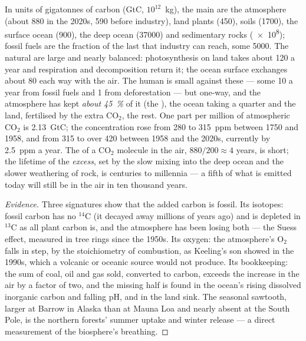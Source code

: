 \begin{proposition}\label{prop:b2:biogeochemical-cycles:carbon}
In units of gigatonnes of carbon (\unit{GtC}, $10^{12}$~kg), the
main  are the atmosphere (about 880 in the 2020s, 590
before industry), land plants (450), soils (1700), the surface
ocean (900), the deep ocean (\num{37000}) and sedimentary rocks
(\num{e8}); fossil fuels are the fraction of the last that
industry can reach, some \num{5000}. The natural  are large
and nearly balanced: photosynthesis on land takes about 120 a
year and respiration and decomposition return it; the ocean
surface exchanges about 80 each way with the air. The human  is
small against these --- some 10 a year from fossil fuels and 1
from deforestation --- but one-way, and the atmosphere has kept
\emph{about \qty{45}{\%}} of it (the \emph{}),
the ocean taking a quarter and the land, fertilised by the extra
$\mathrm{CO_2}$, the rest. One part per million of atmospheric $\mathrm{CO_2}$ is
\qty{2.13}{GtC}; the concentration rose from 280 to \num{315}~ppm
between 1750 and 1958, and from 315 to over \num{420} between 1958
and the 2020s, currently by \qty{2.5}{ppm} a year. The  of a $\mathrm{CO_2}$ molecule in the air, $880/200 \approx 4$ years,
is short; the lifetime of the \emph{excess}, set by the slow
mixing into the deep ocean and the slower weathering of rock, is
centuries to millennia --- a fifth of what is emitted today will
still be in the air in ten thousand years.
\end{proposition}
\begin{proof}[Evidence]
Three signatures show that the added carbon is fossil. Its
isotopes: fossil carbon has no $\mathrm{{}^{14}C}$ (it decayed away
millions of years ago) and is depleted in $\mathrm{{}^{13}C}$ as all plant
carbon is, and the atmosphere has been losing both --- the Suess
effect, measured in tree rings since the 1950s. Its oxygen: the
atmosphere's $\mathrm{O_2}$ falls in step, by the stoichiometry of
combustion, as Keeling's son showed in the 1990s, which a volcanic
or oceanic source would not produce. Its bookkeeping: the sum of
coal, oil and gas sold, converted to carbon, exceeds the increase
in the air by a factor of two, and the missing half is found in
the ocean's rising dissolved inorganic carbon and falling pH, and
in the land sink. The seasonal sawtooth, larger at Barrow in Alaska
than at Mauna Loa and nearly absent at the South Pole, is the
northern forests' summer uptake and winter release --- a direct
measurement of the biosphere's breathing.
\end{proof}


